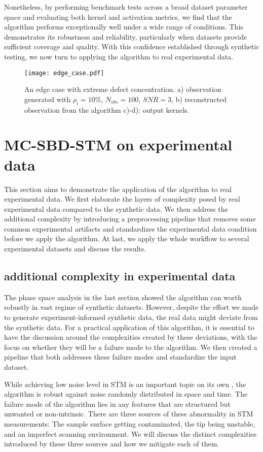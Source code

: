 Nonetheless, by performing benchmark tests across a broad dataset parameter space and evaluating both kernel and activation metrics, we find that the algorithm performs exceptionally well under a wide range of conditions. This demonstrates its robustness and reliability, particularly when datasets provide sufficient coverage and quality. With this confidence established through synthetic testing, we now turn to applying the algorithm to real experimental data.

\begin{figure}
	\texttt{[image: edge\_case.pdf]} 
	\centering
	\caption{An edge case with extreme defect concentration. a) observation generated with $\rho_i = 10\%$, $N_{obs}=100$, $SNR=3$, b) reconstructed observation from the algorithm c)-d): output kernels.}
	\label{fig:edge_case}
\end{figure}

\section{MC-SBD-STM on experimental data}
This section aims to demonstrate the application of the algorithm to real experimental data. We first elaborate the layers of complexity posed by real experimental data compared to the synthetic data. We then address the additional complexity by introducing a preprocessing pipeline that removes some common experimental artifacts and standardizes the experimental data condition before we apply the algorithm. At last, we apply the whole workflow to several experimental datasets and discuss the results. 
 
\subsection{additional complexity in experimental data}
The phase space analysis in the last section showed the algorithm can worth robustly in vast regime of synthetic datasets. However, despite the effort we made to generate experiment-informed synthetic data, the real data might deviate from the synthetic data. For a practical application of this algorithm, it is essential to have the discussion around the complexities created by these deviations, with the focus on whether they will be a failure mode to the algorithm. We then created a pipeline that both addresses these failure modes and standardize the input dataset.

While achieving low noise level in \ac{STM} is an important topic on its own \cite{Jian-Feng Ge}, the algorithm is robust against noise randomly distributed in space and time. The failure mode of the algorithm lies in any features that are structured but unwanted or non-intrinsic. There are three sources of these abnormality in \ac{STM} measurements: The sample surface getting contaminated, the tip being unstable, and an imperfect scanning environment. We will discuss the distinct complexities introduced by these three sources and how we mitigate each of them.  

